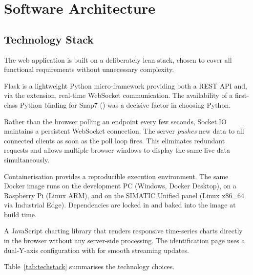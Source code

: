 \chapter{Software Architecture}

\section{Technology Stack}

The web application is built on a deliberately lean stack, chosen to cover all functional
requirements without unnecessary complexity.

\begin{description}[leftmargin=2cm, style=nextline, itemsep=4pt]
  \item[Python / Flask]
    Flask is a lightweight Python micro-framework providing both a REST API and, via the
     extension, real-time WebSocket communication. The availability
    of a first-class Python binding for Snap7 () was a decisive factor
    in choosing Python.

  \item[Socket.IO]
    Rather than the browser polling an endpoint every few seconds, Socket.IO maintains a
    persistent WebSocket connection. The server \textit{pushes} new data to all connected
    clients as soon as the poll loop fires. This eliminates redundant requests and allows
    multiple browser windows to display the same live data simultaneously.

  \item[Docker]
    Containerisation provides a reproducible execution environment. The same Docker image
    runs on the development PC (Windows, Docker Desktop), on a Raspberry Pi (Linux ARM),
    and on the SIMATIC Unified panel (Linux x86\_64 via Industrial Edge). Dependencies are
    locked in  and baked into the image at build time.

  \item[Chart.js]
    A JavaScript charting library that renders responsive time-series charts directly in
    the browser without any server-side processing. The identification page uses a dual-Y-axis
    configuration with  for smooth streaming updates.
\end{description}

Table~\ref{tab:techstack} summarises the technology choices.

